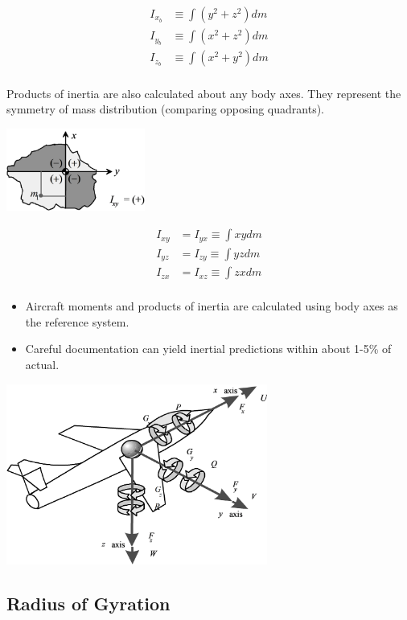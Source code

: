 \documentclass[
]{book}
\providecommand{\tightlist}{%
  \setlength{\itemsep}{0pt}\setlength{\parskip}{0pt}}
\begin{document}
\[
\begin{align}
I_{x_b} &\equiv \int \left( y^2 + z^2 \right) dm \\
I_{y_b} &\equiv \int \left( x^2 + z^2 \right) dm \\
I_{z_b} &\equiv \int \left( x^2 + y^2 \right) dm \\
\end{align}
\]

Products of inertia are also calculated about any body axes. They represent the symmetry of mass distribution (comparing opposing quadrants).

\includegraphics[width=1.79236in,height=1.07083in]{media/07/image16.svg}

\[
\begin{align}
I_{xy} &= I_{yx} \equiv \int xy dm \\
I_{yz} &= I_{zy} \equiv \int yz dm \\
I_{zx} &= I_{xz} \equiv \int zx dm \\
\end{align}
\]

\begin{itemize}
\tightlist
\item
  Aircraft moments and products of inertia are calculated using body axes as the reference system.
\item
  Careful documentation can yield inertial predictions within about 1-5\% of actual.
\end{itemize}

\includegraphics[width=3.37222in,height=2.33681in]{media/07/image17.svg}

\hypertarget{radius-of-gyration}{%
\subsection{Radius of Gyration}\label{radius-of-gyration}}
\end{document}
